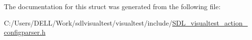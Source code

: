 The documentation for this struct was generated from the following file\-:\begin{DoxyCompactItemize}
\item 
C\-:/\-Users/\-D\-E\-L\-L/\-Work/sdlvisualtest/visualtest/include/\hyperlink{_s_d_l__visualtest__action__configparser_8h}{S\-D\-L\-\_\-visualtest\-\_\-action\-\_\-configparser.\-h}\end{DoxyCompactItemize}
